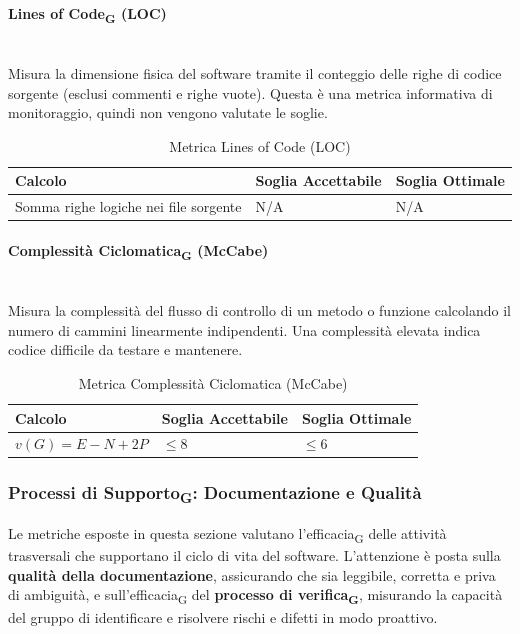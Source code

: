 \documentclass[11pt,a4paper]{article}
\newcommand{\gls}[1]{#1\textsubscript{G}}
\begin{document}
\paragraph{Lines of Code\textsubscript{G} (LOC)} \hfill \\
Misura la dimensione fisica del software tramite il conteggio delle righe di codice sorgente (esclusi commenti e righe vuote). Questa è una metrica informativa di monitoraggio, quindi non vengono valutate le soglie.

\begin{table}[H]
    \centering
    \renewcommand{\arraystretch}{1.5}
    \begin{tabular}{|M{0.4\textwidth}|M{0.25\textwidth}|M{0.25\textwidth}|}
        \hline
        \textbf{Calcolo} & \textbf{Soglia Accettabile} & \textbf{Soglia Ottimale} \\
        \hline
        Somma righe logiche nei file sorgente & N/A & N/A \\
        \hline
    \end{tabular}
    \caption{Metrica Lines of Code (LOC)}
\end{table}

\paragraph{Complessità Ciclomatica\textsubscript{G} (McCabe)} \hfill \\
Misura la complessità del flusso di controllo di un metodo o funzione calcolando il numero di cammini linearmente indipendenti. Una complessità elevata indica codice difficile da testare e mantenere.

\begin{table}[H]
    \centering
    \renewcommand{\arraystretch}{1.5}
    \begin{tabular}{|M{0.4\textwidth}|M{0.25\textwidth}|M{0.25\textwidth}|}
        \hline
        \textbf{Calcolo} & \textbf{Soglia Accettabile} & \textbf{Soglia Ottimale} \\
        \hline
        $v(G) = E - N + 2P$ & $\le 8$ & $\le 6$ \\
        \hline
    \end{tabular}
    \caption{Metrica Complessità Ciclomatica (McCabe)}
\end{table}

\newpage
\subsubsection{\gls{Processi di Supporto}: Documentazione e Qualità}
Le metriche esposte in questa sezione valutano l'\gls{efficacia} delle attività trasversali che supportano il ciclo di vita del software.
L'attenzione è posta sulla \textbf{qualità della documentazione}, assicurando che sia leggibile, corretta e priva di ambiguità, e sull'\gls{efficacia} del \textbf{processo di \gls{verifica}}, misurando la capacità del gruppo di identificare e risolvere rischi e difetti in modo proattivo.
\end{document}

